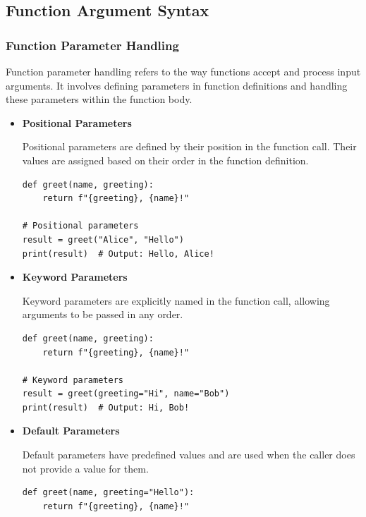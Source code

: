 \newpage
\subsection{Function Argument Syntax}
\subsubsection{Function Parameter Handling}
Function parameter handling refers to the way functions accept and process input arguments. It involves defining parameters in function definitions and handling these parameters within the function body.

\begin{itemize}
    \item \textbf{Positional Parameters}
    
    Positional parameters are defined by their position in the function call. Their values are assigned based on their order in the function definition.
    
    \begin{codebox}
\begin{verbatim}
def greet(name, greeting):
    return f"{greeting}, {name}!"

# Positional parameters
result = greet("Alice", "Hello")
print(result)  # Output: Hello, Alice!
\end{verbatim}
\end{codebox}
    
    
    \item \textbf{Keyword Parameters}
    
    Keyword parameters are explicitly named in the function call, allowing arguments to be passed in any order.
     \begin{codebox}
\begin{verbatim}
def greet(name, greeting):
    return f"{greeting}, {name}!"

# Keyword parameters
result = greet(greeting="Hi", name="Bob")
print(result)  # Output: Hi, Bob!
\end{verbatim}
\end{codebox}
    
    \item \textbf{Default Parameters}
    
    Default parameters have predefined values and are used when the caller does not provide a value for them.
         \begin{codebox}
\begin{verbatim}
def greet(name, greeting="Hello"):
    return f"{greeting}, {name}!"


\end{verbatim}
\end{codebox}
\end{itemize}
